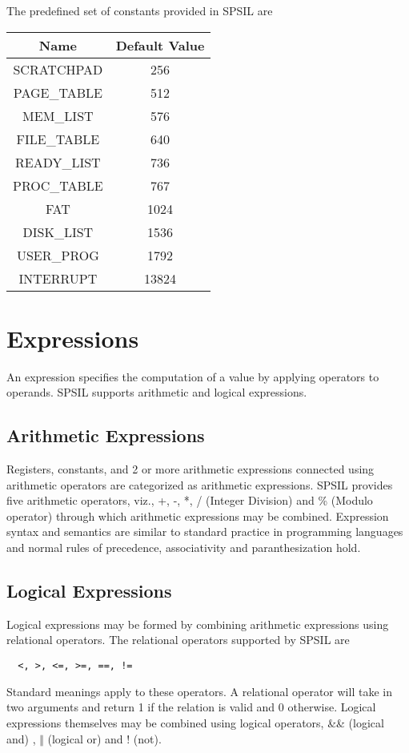 \documentclass[11pt]{article}
\begin{document}
The predefined set of constants provided in SPSIL are \\
\begin{center}
\begin{tabular}{| c | c |}
\hline
\textbf{Name} & \textbf{Default Value} \\
\hline
SCRATCHPAD 	& 	256 \\
\hline
PAGE\_TABLE 	& 	512  \\
\hline
MEM\_LIST 	&	576 	\\
\hline
FILE\_TABLE 	& 	640		\\
\hline
READY\_LIST 	& 	736	\\
\hline
PROC\_TABLE 	& 	767 \\
\hline
FAT 		& 	1024    \\
\hline
DISK\_LIST 	& 	1536 	\\
\hline
USER\_PROG 	& 	1792	\\
\hline
INTERRUPT & 	13824	\\
\hline
\end{tabular}
\end{center}


\section{Expressions}
An expression specifies the computation of a value by applying operators to operands. SPSIL supports arithmetic and logical expressions.

\subsection{Arithmetic Expressions}

Registers, constants, and 2 or more arithmetic expressions connected using arithmetic operators are categorized as arithmetic expressions. SPSIL provides five arithmetic operators, viz., +, -, *, / (Integer Division) and \% (Modulo operator) through which arithmetic expressions may be combined. Expression syntax and semantics are similar to standard practice in programming languages and normal rules of precedence, associativity and paranthesization hold. 


\subsection{Logical Expressions}

Logical expressions may be formed by combining arithmetic expressions using relational operators. The relational operators supported by SPSIL are \begin{verbatim}  <, >, <=, >=, ==, !=
\end{verbatim}
Standard  meanings apply to these operators. A relational operator will take in two arguments and return 1 if the relation is valid and 0 otherwise. Logical expressions themselves may be combined using logical operators, \&\& (logical and) ,  $\Vert$ (logical or) and ! (not).
\end{document}
